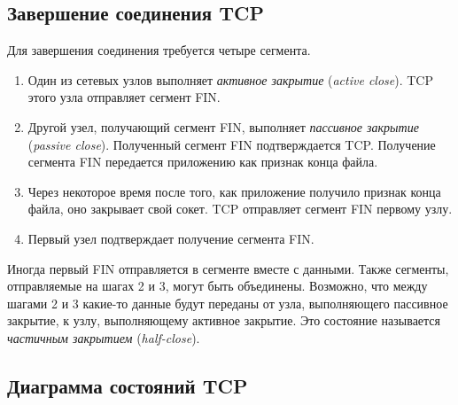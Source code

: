 \subsection{Завершение соединения TCP}
Для завершения соединения требуется четыре сегмента.

\begin{enumerate}
  \item Один из сетевых узлов выполняет \emph{активное закрытие} (\emph{active close}). TCP этого узла отправляет сегмент FIN.
  \item Другой узел, получающий сегмент FIN, выполняет \emph{пассивное закрытие} (\emph{passive close}). Полученный сегмент FIN подтверждается TCP. Получение сегмента FIN передается приложению как признак конца файла.
  \item Через некоторое время после того, как приложение получило признак конца файла, оно закрывает свой сокет. TCP отправляет сегмент FIN первому узлу.
  \item Первый узел подтверждает получение сегмента FIN.
\end{enumerate}

Иногда первый FIN отправляется в сегменте вместе с данными. Также сегменты, отправляемые на шагах 2 и 3, могут быть объединены. Возможно, что между шагами 2 и 3 какие-то данные будут переданы от узла, выполняющего пассивное закрытие, к узлу, выполняющему активное закрытие. Это состояние называется \emph{частичным закрытием} (\emph{half-close}).

\subsection{Диаграмма состояний TCP}



